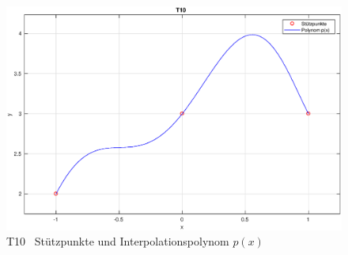 \documentclass[10pt,a4paper]{article}
\begin{document}
	\begin{figure}[htbp]
		\centering
		\includegraphics[width=1.0\textwidth]{T10}
		\caption{T10 \, Stützpunkte und Interpolationspolynom $p(x)$}
	\end{figure}
	\newpage
	
\end{document}

